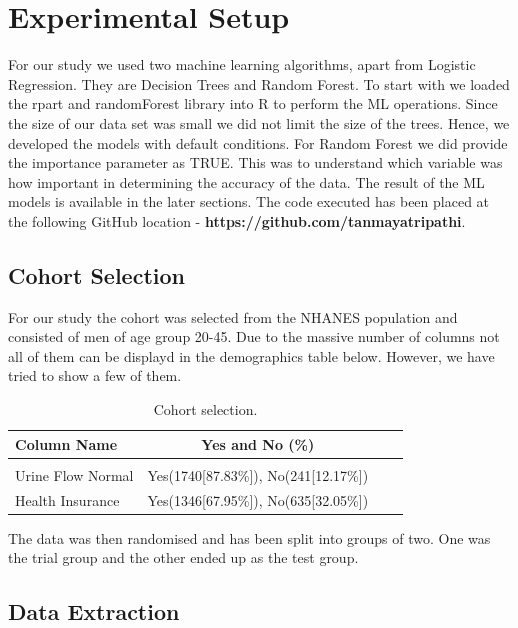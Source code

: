\documentclass[twoside,11pt]{article}
\begin{document}
\section{Experimental Setup} \label{experiment}

For our study we used two machine learning algorithms, apart from Logistic Regression. They are Decision Trees and Random Forest. To start with we loaded the rpart and randomForest library into R to perform the ML operations. Since the size of our data set was small we did not limit the size of the trees. Hence, we developed the models with default conditions.
\vspace{5mm}For Random Forest we did provide the importance parameter as TRUE. This was to understand which variable was how important in determining the accuracy of the data. The result of the ML models is available in the later sections. The code executed has been placed at the following GitHub location - \textbf{https://github.com/tanmayatripathi}.

\subsection{Cohort Selection} 

For our study the cohort was selected from the NHANES population and consisted of men of age group 20-45. Due to the massive number of columns not all of them can be displayd in the demographics table below. However, we have tried to show a few of them.

\begin{table}[htbp]
  \centering 
  \begin{tabular}{lclc} 
    Column Name & Yes and No (\%) \\ 
    \hline \\[-11pt]
    Urine Flow Normal & Yes(1740[87.83\%]), No(241[12.17\%]) \\ 
    Health Insurance & Yes(1346[67.95\%]), No(635[32.05\%]) \\ \hline 
  \end{tabular}
  \label{tab:demogrpahics} 
    \caption{Cohort selection.} 
\end{table}

The data was then randomised and has been split into groups of two. One was the trial group and the other ended up as the test group.

\subsection{Data Extraction} 
\end{document}
